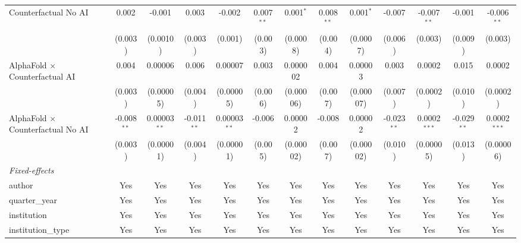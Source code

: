 \begin{tabular}{lcccccccccccc}
   Counterfactual No AI                     & 0.002         & -0.001          & 0.003         & -0.002         & 0.007$^{**}$  & 0.001$^{*}$   & 0.008$^{**}$ & 0.001$^{*}$   & -0.007        & -0.007$^{**}$  & -0.001        & -0.006$^{**}$\\   
                                            & (0.003)       & (0.0010)        & (0.003)       & (0.001)        & (0.003)       & (0.0008)      & (0.004)      & (0.0007)      & (0.006)       & (0.003)        & (0.009)       & (0.003)\\   
   AlphaFold $\times$ Counterfactual AI     & 0.004         & 0.00006         & 0.006         & 0.00007        & 0.003         & 0.000002      & 0.004        & 0.00003       & 0.003         & 0.0002         & 0.015         & 0.0002\\   
                                            & (0.003)       & (0.00005)       & (0.004)       & (0.00005)      & (0.006)       & (0.00006)     & (0.007)      & (0.00007)     & (0.007)       & (0.0002)       & (0.010)       & (0.0002)\\   
   AlphaFold $\times$ Counterfactual No AI  & -0.008$^{**}$ & 0.00003$^{**}$  & -0.011$^{**}$ & 0.00003$^{**}$ & -0.006        & 0.00002       & -0.008       & 0.00002       & -0.023$^{**}$ & 0.0002$^{***}$ & -0.029$^{**}$ & 0.0002$^{***}$\\   
                                            & (0.003)       & (0.00001)       & (0.004)       & (0.00001)      & (0.005)       & (0.00002)     & (0.007)      & (0.00002)     & (0.010)       & (0.00005)      & (0.013)       & (0.00006)\\   
   \midrule
   \emph{Fixed-effects}\\
   author                                   & Yes           & Yes             & Yes           & Yes            & Yes           & Yes           & Yes          & Yes           & Yes           & Yes            & Yes           & Yes\\  
   quarter\_year                            & Yes           & Yes             & Yes           & Yes            & Yes           & Yes           & Yes          & Yes           & Yes           & Yes            & Yes           & Yes\\  
   institution                              & Yes           & Yes             & Yes           & Yes            & Yes           & Yes           & Yes          & Yes           & Yes           & Yes            & Yes           & Yes\\  
   institution\_type                        & Yes           & Yes             & Yes           & Yes            & Yes           & Yes           & Yes          & Yes           & Yes           & Yes            & Yes           & Yes\\  

\end{tabular}
